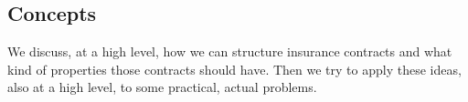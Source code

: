 
\begin{partbacktext}
\part{Concepts}
\noindent We discuss, at a high level, how we can structure insurance contracts and what kind of properties those contracts
should have. Then we try to apply these ideas, also at a high level, to some practical, actual problems.

\end{partbacktext}
